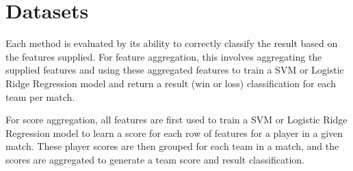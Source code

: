 \documentclass[conference]{IEEEtran}
\begin{document}

\section{Datasets} Each method is evaluated by its ability to correctly classify the result based on the features supplied. For feature aggregation, this involves aggregating the supplied features and using these aggregated features to train a SVM or Logistic Ridge Regression model and return a result (win or loss) classification for each team per match.

For score aggregation, all features are first used to train a SVM or Logistic Ridge Regression model to learn a score for each row of features for a player in a given match. These player scores are then grouped for each team in a match, and the scores are aggregated to generate a team score and result classification.

%
%
\end{document}
